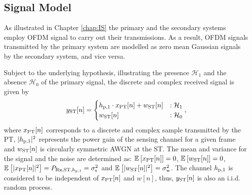 

\subsection{Signal Model}
As illustrated in Chapter \ref{chap:IS} the primary and the secondary systems employ OFDM signal to carry out their transmissions. As a result, OFDM signals transmitted by the primary system are modelled as zero mean Gaussian signals by the secondary system, and vice versa. 

Subject to the underlying hypothesis, illustrating the presence $\mathcal H_1$ and the absence $\mathcal H_0$ of the primary signal, the discrete and complex received signal is given by 
\begin{equation}
y_{\text{ST}}[n] = 
\begin{cases}
h_{\text{p,1}} \cdot x_{\text{PT}}[n] + w_{\text{ST}}[n] & : \mathcal{H}_1 \\
w_{\text{ST}}[n] & :\mathcal{H}_0
\end{cases},
\label{eq_HS:sig_mod_st}
\end{equation}
where $x_{\text{PT}}[n]$ corresponds to a discrete and complex sample transmitted by the PT, $|h_{\text{p,1}}|^2$ represents the power gain of the sensing channel for a given frame and $w_{\text{ST}}[n]$ is circularly symmetric AWGN at the ST. 
The mean and variance for the signal and the noise are determined as: ${\mathbb E}_{}\left[ x_{\text{PT}}[n] \right] = 0$, ${\mathbb E}_{}\left[ w_{\text{ST}}[n] \right] = 0$, ${\mathbb E}_{}\left[ |x_{\text{PT}}[n]|^2 \right] = P_{\text{Rx,ST,$h_{\text{p,1}}$}} = \sigma^2_{\text{s}}$ and ${\mathbb E}_{}\left[ |w_{\text{ST}}[n]|^2 \right] = \sigma^2_{\text{w}}$. 
The channel $h_{\text{p,1}}$ is considered to be independent of $x_{\text{PT}}[n]$ and $w[n]$, thus, $y_{\text{ST}}[n]$ is also an i.i.d. random process.

